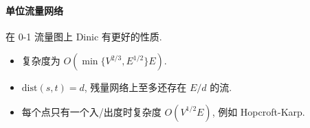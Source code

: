\begin{small}

\paragraph{单位流量网络}
在 0-1 流量图上 Dinic 有更好的性质. 
\begin{itemize}
	\setlength{\itemsep}{0pt}
	\setlength{\parskip}{0pt}
	\setlength{\parsep}{0pt}
	\item 复杂度为 $O(\min \{V ^ {2/3}, E ^ {1/2}\} E)$.
	\item $\mathrm{dist} (s, t) = d$, 残量网络上至多还存在 $E/d$ 的流.
	\item 每个点只有一个入/出度时复杂度 $O(V ^ {1 /2 } E)$, 例如 Hopcroft-Karp.
\end{itemize}
\end{small}